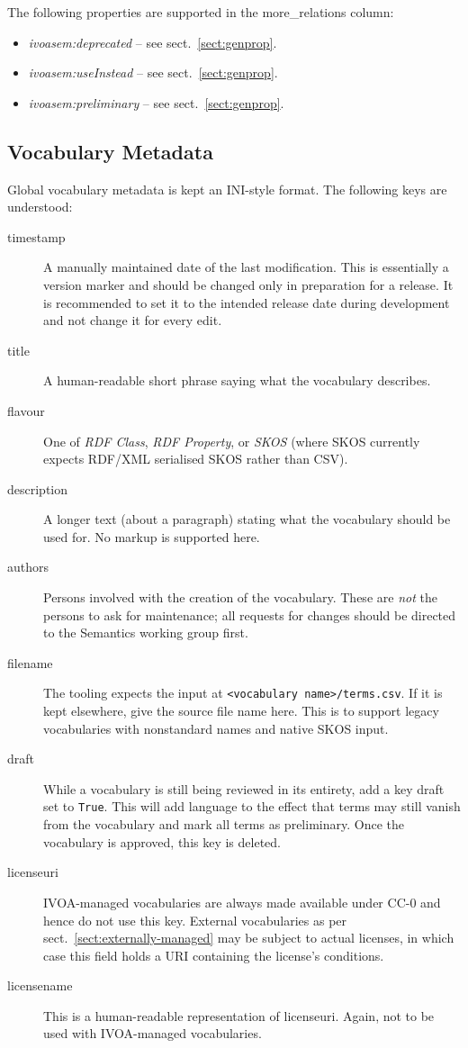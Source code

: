 \documentclass[11pt,a4paper]{ivoa}
\newcommand{\vocterm}[1]{\emph{\color{termcolor}#1}}
\begin{document}
The following properties are supported in the more\_relations
column:

\begin{itemize}
\item \vocterm{ivoasem:deprecated} -- see sect.~\ref{sect:genprop}.
\item \vocterm{ivoasem:useInstead} -- see sect.~\ref{sect:genprop}.
\item \vocterm{ivoasem:preliminary} -- see sect.~\ref{sect:genprop}.
\end{itemize}

\subsection{Vocabulary Metadata}
\label{sect:vocmeta}

Global vocabulary metadata is kept an INI-style format.  The following
keys are understood:

\begin{description}
\item[timestamp]
  A manually maintained date of the last modification.  This is
  essentially a version marker and should be changed only in preparation
  for a release.  It is recommended to set it to the intended release
  date during development and not change it for every edit.
\item[title]
  A human-readable short phrase saying what the vocabulary describes.
\item[flavour]
  One of \textit{RDF Class}, \textit{RDF Property}, or \textit{SKOS}
  (where SKOS currently expects RDF/XML serialised SKOS rather than CSV).
\item[description]
  A longer text (about a paragraph) stating what the vocabulary should
  be used for.  No markup is supported here.
\item[authors]
  Persons involved with the creation of the vocabulary.  These are \emph{not}
  the persons to ask for maintenance; all requests for changes should be
  directed to the Semantics working group first.
\item[filename]
  The tooling expects the input at
  \verb|<vocabulary name>/terms.csv|.  If it is kept elsewhere, give
  the source file name here.  This is to support legacy
  vocabularies with nonstandard names and native SKOS input.
\item[draft]
  While a vocabulary is still being reviewed in its entirety, add a key
  draft set to \texttt{True}.  This will add language to the effect that
  terms may still vanish from the vocabulary and mark all terms as
  preliminary.  Once the vocabulary is approved, this key is deleted.
\item[licenseuri]
  IVOA-managed vocabularies are always made available under CC-0 and
  hence do not use this key.  External vocabularies as per
  sect.~\ref{sect:externally-managed} may be subject to actual licenses,
  in which case this field holds a URI containing the license's
  conditions.
\item[licensename]
  This is a human-readable representation of licenseuri.  Again, not to
  be used with IVOA-managed vocabularies.
\end{description}
\end{document}
